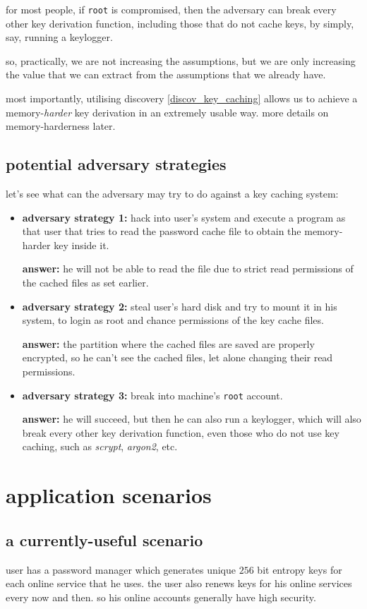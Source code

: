 \documentclass[twocolumn]{article}
\begin{document}
for most people, if \texttt{root} is compromised, then the adversary
can break every other key derivation function, including those that do
not cache keys, by simply, say, running a keylogger.

so, practically, we are not increasing the assumptions, but we are only
increasing the value that we can extract from the assumptions that we
already have.

most importantly, utilising discovery \ref{discov_key_caching} allows us to
achieve a memory-\emph{harder} key derivation in an extremely  usable way.
more details on memory-harderness later.

\subsection{potential adversary strategies}
let's see what can the adversary may try to do against a key caching
system:
\begin{itemize}
    \item \textbf{adversary strategy 1:} hack into user's system and execute a
    program as that user that tries to read the password cache file to
    obtain the memory-harder key inside it.

    \textbf{answer:} he will not be able to read the file due to strict
    read permissions of the cached files as set earlier.

    \item \textbf{adversary strategy 2:} steal user's hard disk and try to
    mount it in his system, to login as root and chance permissions of the
    key cache files.

    \textbf{answer:} the partition where the cached files are saved are
    properly encrypted, so he can't see the cached files, let alone
    changing their read permissions.

    \item \textbf{adversary strategy 3:} break into machine's \texttt{root}
    account.

    \textbf{answer:} he will succeed, but then he can also run a keylogger,
    which will also break every other key derivation function, even those
    who do not use key caching, such as \emph{scrypt}, \emph{argon2}, etc.
\end{itemize}

\section{application scenarios}
\subsection{a currently-useful scenario}
user has a password manager which generates unique $256$ bit entropy keys for
each online service that he uses.  the user also renews keys for his online
services every now and then.   so his online accounts generally have high
security.  
\end{document}
